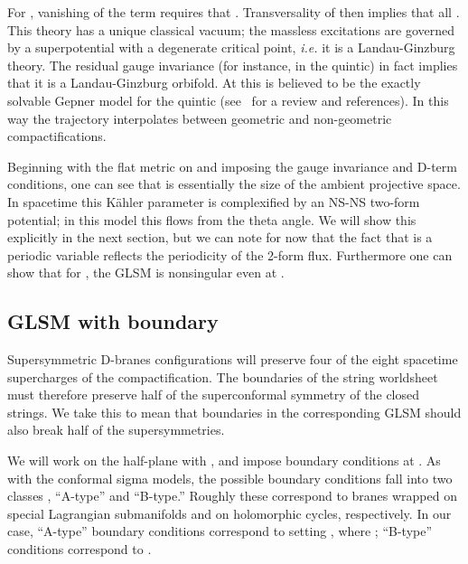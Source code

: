 \documentclass[a4paper,12pt]{article}
\def\Bbb{\mathbb}
\def\BZ{\mbox{\myHighlight{$\Bbb Z$}\coordHE{}}} \def\BR{\mbox{\myHighlight{$\Bbb R$}\coordHE{}}}
\def\BC{\mbox{\myHighlight{$\Bbb C$}\coordHE{}}} \def\BP{\mbox{\myHighlight{$\Bbb P$}\coordHE{}}}
\begin{document}
For \coordHE{}, vanishing of the \coordHE{} term requires that \coordHE{}.
Transversality of \coordHE{} then implies that all \coordHE{}.  This theory has a
unique classical vacuum; the massless excitations are governed by a
superpotential with a degenerate critical point, {\it i.e.} it is a
Landau-Ginzburg theory.  The residual gauge invariance (for instance,
\myHighlight{$\BZ_5$}\coordHE{} in 
the quintic) in fact implies that it is a Landau-Ginzburg orbifold. At \coordHE{} this is believed to be the exactly solvable Gepner
model for the quintic \cite{gepner} (see \cite{psarev}\ for a review and
references).  In this way the trajectory \coordHE{}
interpolates between geometric and non-geometric compactifications. 

Beginning with the flat metric on \myHighlight{${\bf \BC}^{5}$}\coordHE{} and imposing the gauge
invariance and D-term conditions, one can see that \coordHE{} is essentially the
size of the ambient projective space.  In spacetime this K\"ahler
parameter is complexified by an NS-NS two-form potential; in this model
this flows from the theta angle.  We will show this explicitly in the next
section, but we can note for now that the fact that \myHighlight{$\theta$}\coordHE{} is a periodic
variable reflects the periodicity of the 2-form flux.  Furthermore one can
show that for \coordHE{}, the GLSM is nonsingular even at \coordHE{}
\cite{wittenphases}. 

\subsection{GLSM with boundary}

Supersymmetric D-branes configurations will preserve four of the eight
spacetime supercharges of the compactification. The boundaries of the
string worldsheet must therefore preserve half of the \coordHE{}
superconformal symmetry of the closed strings.  We take this to mean that
boundaries in the corresponding GLSM should also break half of the
supersymmetries. 

We will work on the half-plane \coordHE{} with \coordHE{}, and impose
boundary conditions at \coordHE{}. As with the conformal sigma models, the
possible boundary conditions fall into two classes \cite{ooy}, ``A-type''
and ``B-type.'' Roughly these correspond to branes wrapped on special
Lagrangian submanifolds and on holomorphic cycles, respectively. In our
case, ``A-type'' boundary conditions correspond to setting \myHighlight{$\epsilon_\pm =
\eta \overline{\epsilon}_\mp$}\coordHE{}, where \coordHE{}; ``B-type'' conditions
correspond to \myHighlight{$\epsilon_\pm = \eta \epsilon_\mp$}\coordHE{}. 
\end{document}
